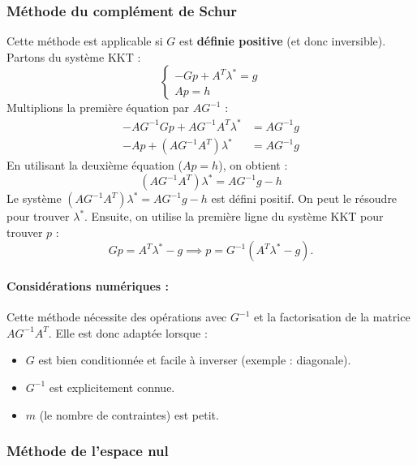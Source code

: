 \subsubsection{Méthode du complément de Schur}

Cette méthode est applicable si $G$ est \textbf{définie positive} (et donc inversible).
Partons du système KKT :
\begin{equation}
    \begin{cases}
        -Gp + A^T \lambda^* = g \\
        Ap = h
    \end{cases}
\end{equation}
Multiplions la première équation par $AG^{-1}$ :
\begin{align*}
    -AG^{-1}Gp + AG^{-1}A^T \lambda^* &= AG^{-1}g \\
    -Ap + (AG^{-1}A^T) \lambda^* &= AG^{-1}g
\end{align*}
En utilisant la deuxième équation ($Ap=h$), on obtient :
\begin{equation}
    (AG^{-1}A^T) \lambda^* = AG^{-1}g - h
\end{equation}
Le système $(AG^{-1}A^T) \lambda^* = AG^{-1}g - h$ est défini positif. On peut le résoudre pour trouver $\lambda^*$.
Ensuite, on utilise la première ligne du système KKT pour trouver $p$ :
\begin{equation}
    Gp = A^T \lambda^* - g \implies p = G^{-1}(A^T \lambda^* - g).
\end{equation}

\paragraph{Considérations numériques :}
Cette méthode nécessite des opérations avec $G^{-1}$ et la factorisation de la matrice $AG^{-1}A^T$. Elle est donc adaptée lorsque :
\begin{itemize}
    \item $G$ est bien conditionnée et facile à inverser (exemple : diagonale).
    \item $G^{-1}$ est explicitement connue.
    \item $m$ (le nombre de contraintes) est petit.
\end{itemize}

\subsubsection{Méthode de l'espace nul}

